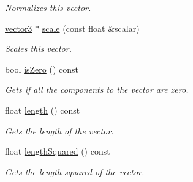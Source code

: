 \begin{DoxyCompactItemize}
\begin{DoxyCompactList}\small\item\em Normalizes this vector. \end{DoxyCompactList}\item 
\hyperlink{classflounder_1_1vector3}{vector3} $\ast$ \hyperlink{classflounder_1_1vector3_ac3556b660b1ce874086da0f185b2630a}{scale} (const float \&scalar)
\begin{DoxyCompactList}\small\item\em Scales this vector. \end{DoxyCompactList}\item 
bool \hyperlink{classflounder_1_1vector3_ac84d3689417819bf2fd1589ed54206df}{is\+Zero} () const
\begin{DoxyCompactList}\small\item\em Gets if all the components to the vector are zero. \end{DoxyCompactList}\item 
float \hyperlink{classflounder_1_1vector3_a1ed0ea13c16392ef7f3b56ea96777144}{length} () const
\begin{DoxyCompactList}\small\item\em Gets the length of the vector. \end{DoxyCompactList}\item 
float \hyperlink{classflounder_1_1vector3_a09de6c48569a03b23f5857ef771461e7}{length\+Squared} () const
\begin{DoxyCompactList}\small\item\em Gets the length squared of the vector. \end{DoxyCompactList}\end{DoxyCompactItemize}
